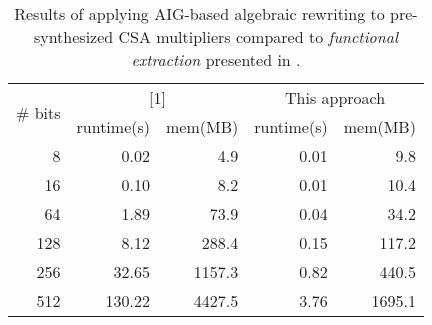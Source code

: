 \begin{table}[t]
\centering
\caption{Results of applying AIG-based algebraic rewriting to pre-synthesized CSA multipliers compared to \textit{functional extraction} presented in \cite{ciesielski2015verification}.}
\vspace{-1mm}
\label{tbl:pre}
\begin{tabular}{|r|r|r|r|r|}
\hline
\multirow{2}{*}{\# bits} & \multicolumn{2}{c|}{{[}1{]}} & \multicolumn{2}{c|}{This approach} \\ \cline{2-5} 
 & runtime(s) & mem(MB) & runtime(s) & mem(MB) \\ \hline
8 & 0.02 & 4.9 & 0.01 & 9.8 \\ \hline
16 & 0.10 & 8.2 & 0.01 & 10.4 \\ \hline
64 & 1.89 & 73.9 & 0.04 & 34.2 \\ \hline
128 & 8.12 & 288.4 & 0.15 & 117.2 \\ \hline
256 & 32.65 & 1157.3 & 0.82 & 440.5 \\ \hline
512 & 130.22 & 4427.5 & 3.76 & 1695.1 \\ \hline
\end{tabular}
\end{table}

